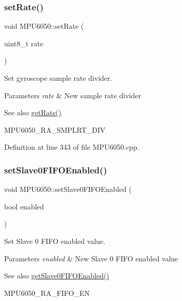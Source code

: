 \subsubsection{\texorpdfstring{setRate()}{setRate()}}
{\footnotesize\ttfamily void M\+P\+U6050\+::set\+Rate (\begin{DoxyParamCaption}\item[{uint8\+\_\+t}]{rate }\end{DoxyParamCaption})}



Set gyroscope sample rate divider. 


\begin{DoxyParams}{Parameters}
{\em rate} & New sample rate divider \\
\hline
\end{DoxyParams}
\begin{DoxySeeAlso}{See also}
\mbox{\hyperlink{classMPU6050_a887a173e079980505763ffd1aa9fec05}{get\+Rate()}} 

M\+P\+U6050\+\_\+\+R\+A\+\_\+\+S\+M\+P\+L\+R\+T\+\_\+\+D\+IV 
\end{DoxySeeAlso}


Definition at line 343 of file M\+P\+U6050.\+cpp.

\mbox{\label{classMPU6050_a97fbf27e1b827f9dfc3c28ff376b54c4}} 
\subsubsection{\texorpdfstring{setSlave0FIFOEnabled()}{setSlave0FIFOEnabled()}}
{\footnotesize\ttfamily void M\+P\+U6050\+::set\+Slave0\+F\+I\+F\+O\+Enabled (\begin{DoxyParamCaption}\item[{bool}]{enabled }\end{DoxyParamCaption})}



Set Slave 0 F\+I\+FO enabled value. 


\begin{DoxyParams}{Parameters}
{\em enabled} & New Slave 0 F\+I\+FO enabled value \\
\hline
\end{DoxyParams}
\begin{DoxySeeAlso}{See also}
\mbox{\hyperlink{classMPU6050_a6aa7aa2e3fac06f8b5ab9ee127255a5e}{get\+Slave0\+F\+I\+F\+O\+Enabled()}} 

M\+P\+U6050\+\_\+\+R\+A\+\_\+\+F\+I\+F\+O\+\_\+\+EN 
\end{DoxySeeAlso}


